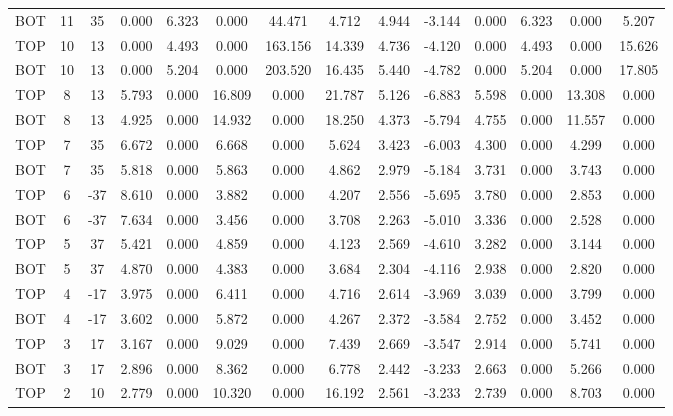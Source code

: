 \begin{landscape}
\begin{table}
\begin{tabular}{|ccc|ccccc|cc|cccc|}
BOT & 11 &  35 &   0.000 &   6.323 &   0.000 &  44.471 &  4.712 & 4.944 & -3.144 &    0.000 &    6.323 &    0.000 &    5.207 \\
TOP & 10 &  13 &   0.000 &   4.493 &   0.000 & 163.156 & 14.339 & 4.736 & -4.120 &    0.000 &    4.493 &    0.000 &   15.626 \\
BOT & 10 &  13 &   0.000 &   5.204 &   0.000 & 203.520 & 16.435 & 5.440 & -4.782 &    0.000 &    5.204 &    0.000 &   17.805 \\
TOP &  8 &  13 &   5.793 &   0.000 &  16.809 &   0.000 & 21.787 & 5.126 & -6.883 &    5.598 &    0.000 &   13.308 &    0.000 \\
BOT &  8 &  13 &   4.925 &   0.000 &  14.932 &   0.000 & 18.250 & 4.373 & -5.794 &    4.755 &    0.000 &   11.557 &    0.000 \\
TOP &  7 &  35 &   6.672 &   0.000 &   6.668 &   0.000 &  5.624 & 3.423 & -6.003 &    4.300 &    0.000 &    4.299 &    0.000 \\
BOT &  7 &  35 &   5.818 &   0.000 &   5.863 &   0.000 &  4.862 & 2.979 & -5.184 &    3.731 &    0.000 &    3.743 &    0.000 \\
TOP &  6 & -37 &   8.610 &   0.000 &   3.882 &   0.000 &  4.207 & 2.556 & -5.695 &    3.780 &    0.000 &    2.853 &    0.000 \\
BOT &  6 & -37 &   7.634 &   0.000 &   3.456 &   0.000 &  3.708 & 2.263 & -5.010 &    3.336 &    0.000 &    2.528 &    0.000 \\
TOP &  5 &  37 &   5.421 &   0.000 &   4.859 &   0.000 &  4.123 & 2.569 & -4.610 &    3.282 &    0.000 &    3.144 &    0.000 \\
BOT &  5 &  37 &   4.870 &   0.000 &   4.383 &   0.000 &  3.684 & 2.304 & -4.116 &    2.938 &    0.000 &    2.820 &    0.000 \\
TOP &  4 & -17 &   3.975 &   0.000 &   6.411 &   0.000 &  4.716 & 2.614 & -3.969 &    3.039 &    0.000 &    3.799 &    0.000 \\
BOT &  4 & -17 &   3.602 &   0.000 &   5.872 &   0.000 &  4.267 & 2.372 & -3.584 &    2.752 &    0.000 &    3.452 &    0.000 \\
TOP &  3 &  17 &   3.167 &   0.000 &   9.029 &   0.000 &  7.439 & 2.669 & -3.547 &    2.914 &    0.000 &    5.741 &    0.000 \\
BOT &  3 &  17 &   2.896 &   0.000 &   8.362 &   0.000 &  6.778 & 2.442 & -3.233 &    2.663 &    0.000 &    5.266 &    0.000 \\
TOP &  2 &  10 &   2.779 &   0.000 &  10.320 &   0.000 & 16.192 & 2.561 & -3.233 &    2.739 &    0.000 &    8.703 &    0.000 \\

\end{tabular}
\end{table}
\end{landscape}
